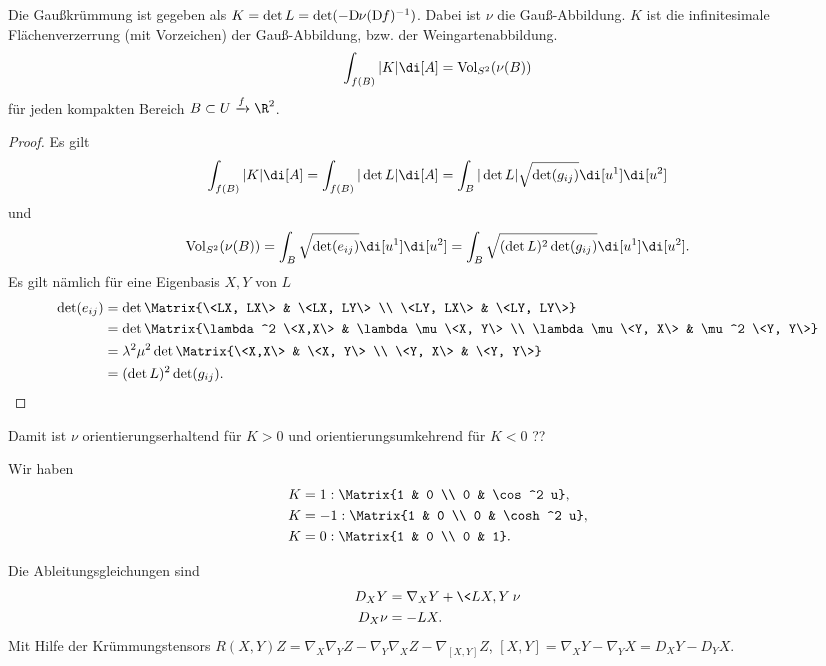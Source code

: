 \begin{nt}
	Die Gaußkrümmung ist gegeben als $K = \det L = \det(-\Df[\nu] (\Df)^{-1})$.
	Dabei ist $\nu$ die Gauß-Abbildung.
	$K$ ist die infinitesimale Flächenverzerrung (mit Vorzeichen) der Gauß-Abbildung, bzw. der Weingartenabbildung.
	\[
		\int_{f(B)} |K| \di[A]
		= \Vol_{S^2}(\nu(B))
	\]
	für  jeden kompakten Bereich $B \subset U \xrightarrow{f} \R^2$.
	\begin{proof}
		Es gilt
		\[
			\int_{f(B)} |K| \di[A]
			= \int_{f(B)} |\det L| \di[A]
			= \int_{B} |\det L| \sqrt{\det (g_{ij})} \di[u^1]\di[u^2]
		\]
		und
		\[
			\Vol_{S^2}(\nu(B))
			= \int_{B}\sqrt{\det (e_{ij})} \di[u^1] \di[u^2]
			= \int_{B}\sqrt{(\det L)^2 \det(g_{ij})} \di[u^1]\di[u^2].
		\]
		Es gilt nämlich für eine Eigenbasis $X, Y$ von $L$
		\begin{align*}
			\det(e_{ij}) &= \det \Matrix{\<LX, LX\> & \<LX, LY\> \\ \<LY, LX\> & \<LY, LY\>} \\
			&= \det \Matrix{\lambda^2 \<X,X\> & \lambda\mu \<X, Y\> \\ \lambda\mu \<Y, X\> & \mu^2 \<Y, Y\>} \\
			&= \lambda^2 \mu^2 \det \Matrix{\<X,X\> & \<X, Y\> \\ \<Y, X\> & \<Y, Y\>} \\
			&= (\det L)^2 \det (g_{ij}).
		\end{align*}
	\end{proof}
	\begin{note}
		Damit ist $\nu$ orientierungserhaltend für $K > 0$ und orientierungsumkehrend für $K < 0$ ??
	\end{note}
\end{nt}

Wir haben
\begin{align*}
	K &= 1 : \Matrix{1 & 0 \\ 0 & \cos^2 u}, \\
	K &= -1 : \Matrix{1 & 0 \\ 0 & \cosh^2 u}, \\
	K &= 0 : \Matrix{1 & 0 \\ 0 & 1}.
\end{align*}



\begin{nt}
	Die Ableitungsgleichungen sind
	\begin{align*}
		D_X  Y &= \nabla_X Y + \<LX, Y\> \nu \\
		D_X \nu &= - LX.
	\end{align*}
	Mit Hilfe der Krümmungstensors $R(X,Y)Z = \nabla_X \nabla_Y Z - \nabla_Y \nabla_X Z - \nabla_{[X,Y]} Z$, $[X,Y] = \nabla_X Y - \nabla_Y X = D_X Y - D_Y X$.
\end{nt}

